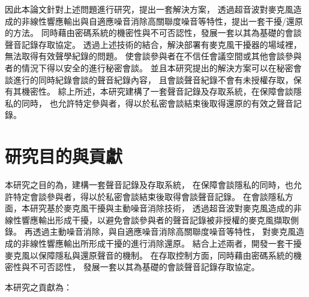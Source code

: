     因此本論文針對上述問題進行研究，提出一套解決方案，
透過超音波對麥克風造成的非線性響應輸出與自適應噪音消除高關聯度噪音等特性，提出一套干擾/還原的方法。
同時藉由密碼系統的機密性與不可否認性，發展一套以其為基礎的會談聲音記錄存取協定。
透過上述技術的結合，解決部署有麥克風干擾器的場域裡，無法取得有效聲學紀錄的問題。
使會談參與者在不信任會議空間或其他會談參與者的情況下得以安全的進行秘密會談。
並且本研究提出的解決方案可以在秘密會談進行的同時紀錄會談的聲音紀錄內容，
且會談聲音紀錄不會有未授權存取，保有其機密性。
綜上所述，本研究建構了一套聲音記錄及存取系統，在保障會談隱私的同時，
也允許特定參與者，得以於私密會談結束後取得還原的有效之聲音記錄。


\section{研究目的與貢獻}\label{section:intro-purpose}

    本研究之目的為，建構一套聲音記錄及存取系統，
在保障會談隱私的同時，也允許特定會談參與者，得以於私密會談結束後取得會談聲音記錄。
在會談隱私方面，本研究基於麥克風干擾與主動噪音消除技術，
透過超音波對麥克風造成的非線性響應輸出形成干擾，以避免會談參與者的聲音記錄被非授權的麥克風擷取側錄。
再透過主動噪音消除，與自適應噪音消除高關聯度噪音等特性，
對麥克風造成的非線性響應輸出所形成干擾的進行消除還原。
結合上述兩者，開發一套干擾麥克風以保障隱私與還原聲音的機制。
在存取控制方面，同時藉由密碼系統的機密性與不可否認性，
發展一套以其為基礎的會談聲音記錄存取協定。

    本研究之貢獻為：

